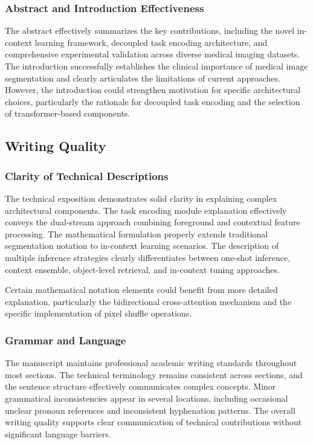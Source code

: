 \subsubsection{Abstract and Introduction Effectiveness}
The abstract effectively summarizes the key contributions, including the novel in-context learning framework, decoupled task encoding architecture, and comprehensive experimental validation across diverse medical imaging datasets. The introduction successfully establishes the clinical importance of medical image segmentation and clearly articulates the limitations of current approaches. However, the introduction could strengthen motivation for specific architectural choices, particularly the rationale for decoupled task encoding and the selection of transformer-based components.

\subsection{Writing Quality}
\subsubsection{Clarity of Technical Descriptions}
The technical exposition demonstrates solid clarity in explaining complex architectural components. The task encoding module explanation effectively conveys the dual-stream approach combining foreground and contextual feature processing. The mathematical formulation properly extends traditional segmentation notation to in-context learning scenarios. The description of multiple inference strategies clearly differentiates between one-shot inference, context ensemble, object-level retrieval, and in-context tuning approaches.

Certain mathematical notation elements could benefit from more detailed explanation, particularly the bidirectional cross-attention mechanism and the specific implementation of pixel shuffle operations.

\subsubsection{Grammar and Language}
The manuscript maintains professional academic writing standards throughout most sections. The technical terminology remains consistent across sections, and the sentence structure effectively communicates complex concepts. Minor grammatical inconsistencies appear in several locations, including occasional unclear pronoun references and inconsistent hyphenation patterns. The overall writing quality supports clear communication of technical contributions without significant language barriers.

